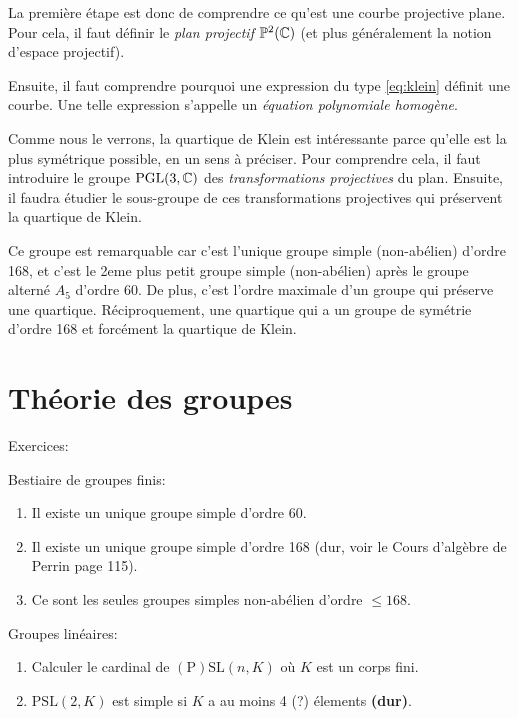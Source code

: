 La première étape est donc de comprendre ce qu'est une courbe projective plane.
Pour cela, il faut définir le \emph{plan projectif}
$ \mathbb{P}^2(\mathbb{C}) $ 
(et plus généralement
la notion d'espace projectif).

Ensuite, il faut comprendre pourquoi une expression
du type \ref{eq:klein} définit une courbe.
Une telle expression s'appelle un \emph{équation polynomiale homogène}.

Comme nous le verrons, la quartique de Klein est intéressante parce
qu'elle est la plus symétrique possible, en un sens à préciser.
Pour comprendre cela, il faut introduire le groupe
$ \mathrm{PGL}(3,\mathbb{C}) $
des \emph{transformations projectives}
du plan.
Ensuite, il faudra étudier le sous-groupe
de ces transformations projectives qui préservent
la quartique de Klein.

Ce groupe est remarquable car c'est l'unique groupe
simple (non-abélien) d'ordre 168, et c'est le 2eme plus petit groupe
simple (non-abélien) après le groupe alterné $ A_{5} $ d'ordre 60.
De plus, c'est l'ordre maximale d'un groupe qui préserve une quartique.
Réciproquement, une quartique qui a un groupe de symétrie d'ordre 168
et forcément la quartique de Klein.

\section{Théorie des groupes}
\label{sec:theorie_des_groupes}

Exercices:

Bestiaire de groupes finis:
\begin{enumerate}
	\item Il existe un unique groupe simple d'ordre 60.
	\item Il existe un unique groupe simple d'ordre 168
		(dur, voir le Cours d'algèbre de Perrin page 115).
	\item Ce sont les seules groupes simples non-abélien d'ordre
		$ \le 168 $.

\end{enumerate}

Groupes linéaires:
\begin{enumerate}
	\item Calculer le cardinal de $ \mathrm{(P)SL}(n, K) $
		où $ K $ est un corps fini.
	\item $ \mathrm{PSL}(2, K) $ est simple si $ K $ a au moins 4 (?)
		élements \textbf{(dur)}.
\end{enumerate}

